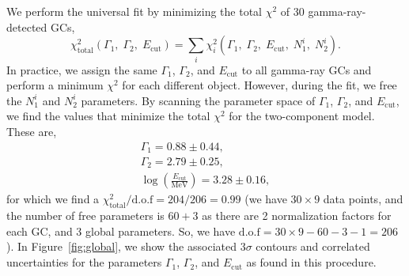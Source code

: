 \documentclass[doublespace,nopageskip]{VTthesis} %
\begin{document}
We perform the universal fit by minimizing the total $\chi^2$ of 30 gamma-ray-detected GCs,
\begin{equation}
    \chi^2_\mathrm{total}(\Gamma_1,\;\Gamma_2,\;E_\mathrm{cut}) = \sum_i\chi_i^2(\Gamma_1,\;\Gamma_2,\;E_\mathrm{cut},\;N_1^i,\;N_2^i).
\end{equation}
In practice, we assign the same $\Gamma_1$, $\Gamma_2$, and $E_\mathrm{cut}$ to all gamma-ray GCs and perform a minimum $\chi^2$ for each different object. However, during the fit, we free the $N_1^i$ and $N_2^i$ parameters. By scanning the parameter space of $\Gamma_1$, $\Gamma_2$, and $E_\mathrm{cut}$, we find the values that minimize the total $\chi^2$ for the two-component model. These are, 
\begin{align}\nonumber
    \Gamma_1 = 0.88 \pm 0.44,\\\nonumber
    \Gamma_2 = 2.79 \pm 0.25,\\\nonumber
    \log\left(\frac{E_\mathrm{cut}}{\mathrm{MeV}}\right) = 3.28 \pm 0.16,
\end{align}
for which we find a $\chi^2_\mathrm{total} / \mathrm{d.o.f} = 204/206 = 0.99$ (we have $30\times 9$ data points, and the number of free parameters is $60+3$ as there are 2 normalization factors for each GC, and 3 global parameters. So, we have $\mathrm{d.o.f}=30\times 9 - 60 - 3 -1 = 206$). In Figure~\ref{fig:global}, we show the associated 3$\sigma$ contours and correlated uncertainties for the parameters $\Gamma_1$, $\Gamma_2$, and $E_\mathrm{cut}$ as found in this procedure.
\end{document}
